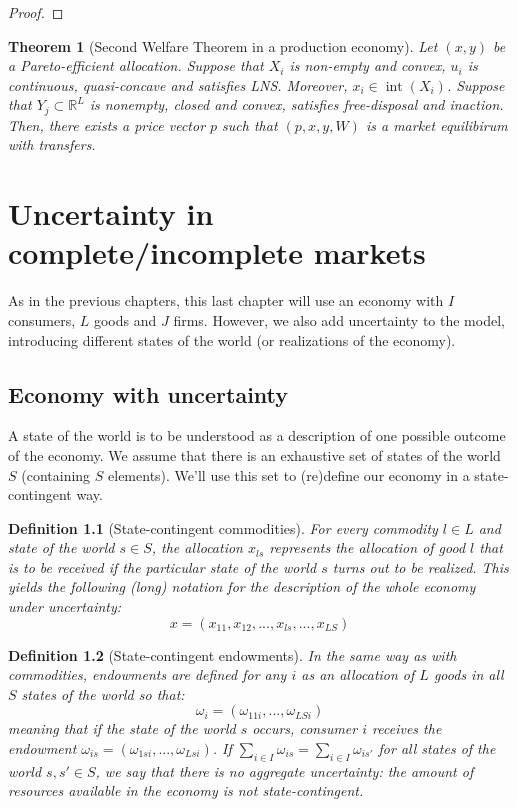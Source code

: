 \documentclass[12pt]{report}
\newtheorem{theorem}{Theorem}[chapter]
\newtheorem{definition}{Definition}[chapter]
\begin{document}
\begin{proof}

\end{proof}

\begin{theorem}[Second Welfare Theorem in a production economy]
Let $(x,y)$ be a Pareto-efficient allocation. Suppose that $X_i$ is non-empty and convex, $u_i$ is continuous, quasi-concave and satisfies LNS. Moreover, $x_i\in \operatorname{int}(X_i)$. Suppose that $Y_j\subset \mathbb{R}^L$ is nonempty, closed and convex, satisfies free-disposal and inaction. Then, there exists a price vector $p$ such that $(p, x,y, W)$ is a market equilibirum with transfers. 
\end{theorem}

\chapter{Uncertainty in complete/incomplete markets}

As in the previous chapters, this last chapter will use an economy with $I$ consumers, $L$ goods and $J$ firms. However, we also add uncertainty to the model, introducing different states of the world (or realizations of the economy).

\section{Economy with uncertainty}

A state of the world is to be understood as a description of one possible outcome of the economy. We assume that there is an exhaustive set of states of the world $S$ (containing $S$ elements). We'll use this set to (re)define our economy in a state-contingent way.

\begin{definition}[State-contingent commodities]
For every commodity $l\in L$ and state of the world $s\in S$, the allocation $x_{ls}$ represents the allocation of good $l$ that is to be received if the particular state of the world $s$ turns out to be realized. This yields the following (long) notation for the description of the whole economy under uncertainty: $$ x = (x_{11}, x_{12}, ..., x_{ls}, ..., x_{LS}) $$
\end{definition}

\begin{definition}[State-contingent endowments]
In the same way as with commodities, endowments are defined for any $i$ as an allocation of $L$ goods in all $S$ states of the world so that: $$\omega_{i} = (\omega_{11i}, ..., \omega_{LSi}) $$ meaning that if the state of the world $s$ occurs, consumer $i$ receives the endowment $\omega_{is} = (\omega_{1si}, ..., \omega_{Lsi})$. If $\sum_{i\in I}\omega_{is} = \sum_{i\in I} \omega_{is'}$ for all states of the world $s,s'\in S$, we say that there is no aggregate uncertainty: the amount of resources available in the economy is not state-contingent.
\end{definition}
\end{document}
